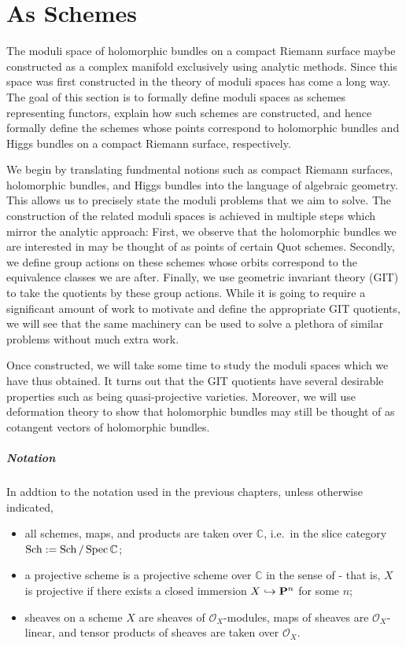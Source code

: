 \documentclass[12pt]{ociamthesis}  %
\begin{document}
\chapter{As Schemes}

The moduli space of holomorphic bundles on a compact Riemann
surface maybe constructed as a complex manifold exclusively
using analytic methods. Since this space was first constructed
in \missingcitation
the theory of moduli spaces has come a long way.
The goal of this section is to formally define moduli spaces
as schemes representing functors, explain how such schemes
are constructed, and hence formally define the schemes whose
points correspond to holomorphic bundles and Higgs bundles
on a compact Riemann surface, respectively.

We begin by translating fundmental notions such as compact
Riemann surfaces, holomorphic bundles, and Higgs bundles into
the language of algebraic geometry. This allows us to precisely state
the moduli problems that we aim to solve. The construction
of the related moduli spaces is achieved in multiple steps which
mirror the analytic approach: First, we observe that the
holomorphic bundles we are interested in may be thought of as
points of certain Quot schemes. Secondly, we define group
actions on these schemes whose orbits correspond to the
equivalence classes we are after. Finally, we use geometric
invariant theory (GIT) to take the quotients by these group
actions. While it is going to require a significant amount of
work to motivate and define the appropriate GIT quotients,
we will see that the same machinery can be used to solve
a plethora of similar problems without much extra work.

Once constructed, we will take some time to study the moduli
spaces which we have thus obtained. It turns out that the GIT
quotients have several desirable properties such as being
quasi-projective varieties. Moreover, we will use deformation
theory to show that holomorphic bundles may still be thought
of as cotangent vectors of holomorphic bundles.

\paragraph*{Notation}

In addtion to the notation used in the previous chapters, unless
otherwise indicated,
\begin{itemize}
  \item all schemes, maps, and products are taken over $\mathbb{C}$,
        i.e.~in the slice category
        $\operatorname{Sch} := \operatorname{Sch}/\operatorname{Spec}\mathbb{C}$;
  \item a projective scheme is a projective scheme over $\mathbb{C}$
        in the sense of \cite{hartshorne1977} - that is, $X$ is projective
        if there exists a closed immersion $X\hookrightarrow\mathbf{P}^{n}_{}$ for
        some $n$;
  \item sheaves on a scheme $X$ are sheaves of $\mathscr O_X$-modules,
        maps of sheaves are $\mathscr O_X$-linear, and tensor products
        of sheaves are taken over $\mathscr O_X$.
\end{itemize}
\end{document}
